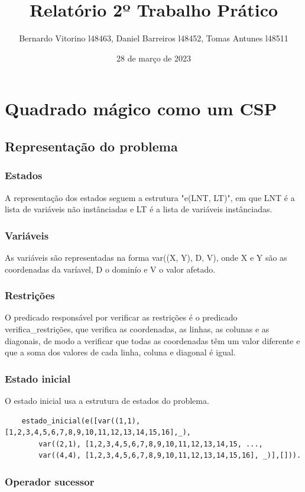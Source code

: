 \documentclass{article}
\title{Relatório 2º Trabalho Prático}
\author{Bernardo Vitorino l48463, Daniel Barreiros l48452, Tomas Antunes l48511}
\date{28 de março de 2023}
\begin{document}
\maketitle

\section{Quadrado mágico como um CSP}
\subsection{Representação do problema}
\subsubsection{Estados}
A representação dos estados seguem a estrutura "e(LNT, LT)", em que LNT é a lista de variáveis não instânciadas e LT é a lista de variáveis instânciadas.

\subsubsection{Variáveis}
As variáveis são representadas na forma var((X, Y), D, V), onde X e Y são as coordenadas da varíavel, D o dominío e V o valor afetado.

\subsubsection{Restrições}
O predicado responsável por verificar as restrições é o predicado verifica\_restrições, que verifica as coordenadas, as linhas, as colunas e as diagonais, de modo a verificar que todas as coordenadas têm um valor diferente e que a soma dos valores de cada linha, coluna e diagonal é igual.

\subsubsection{Estado inicial}
O estado inicial usa a estrutura de estados do problema.

\begin{verbatim}
    estado_inicial(e([var((1,1),[1,2,3,4,5,6,7,8,9,10,11,12,13,14,15,16],_),
        var((2,1), [1,2,3,4,5,6,7,8,9,10,11,12,13,14,15, ..., 
        var((4,4), [1,2,3,4,5,6,7,8,9,10,11,12,13,14,15,16], _)],[])).
\end{verbatim}

\subsubsection{Operador sucessor}
\end{document}
